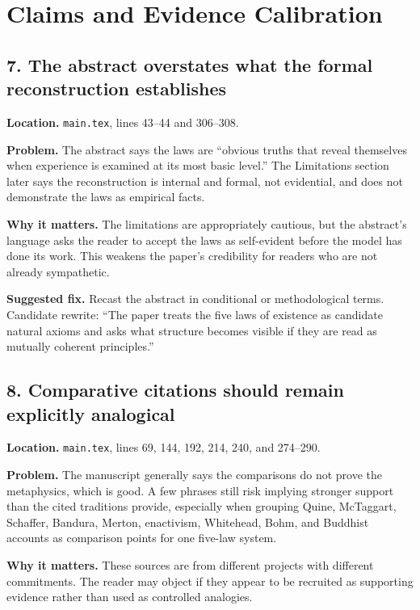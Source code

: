 \documentclass[11pt]{article}
\begin{document}
\section*{Claims and Evidence Calibration}

\subsection*{7. The abstract overstates what the formal reconstruction establishes}

\textbf{Location.} \texttt{main.tex}, lines 43--44 and 306--308.

\textbf{Problem.} The abstract says the laws are ``obvious truths that reveal themselves when experience is examined at its most basic level.'' The Limitations section later says the reconstruction is internal and formal, not evidential, and does not demonstrate the laws as empirical facts.

\textbf{Why it matters.} The limitations are appropriately cautious, but the abstract's language asks the reader to accept the laws as self-evident before the model has done its work. This weakens the paper's credibility for readers who are not already sympathetic.

\textbf{Suggested fix.} Recast the abstract in conditional or methodological terms. Candidate rewrite: ``The paper treats the five laws of existence as candidate natural axioms and asks what structure becomes visible if they are read as mutually coherent principles.''

\subsection*{8. Comparative citations should remain explicitly analogical}

\textbf{Location.} \texttt{main.tex}, lines 69, 144, 192, 214, 240, and 274--290.

\textbf{Problem.} The manuscript generally says the comparisons do not prove the metaphysics, which is good. A few phrases still risk implying stronger support than the cited traditions provide, especially when grouping Quine, McTaggart, Schaffer, Bandura, Merton, enactivism, Whitehead, Bohm, and Buddhist accounts as comparison points for one five-law system.

\textbf{Why it matters.} These sources are from different projects with different commitments. The reader may object if they appear to be recruited as supporting evidence rather than used as controlled analogies.
\end{document}

